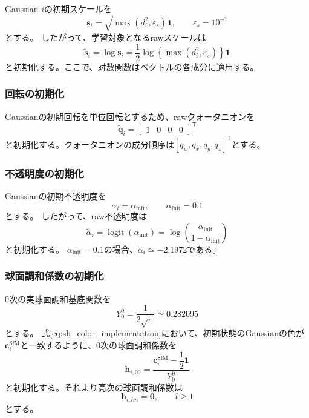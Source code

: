 \documentclass[dvipdfmx]{jlreq}
\begin{document}
Gaussian $i$の初期スケールを
\begin{equation}
    \bm{s}_i = \sqrt{\max\left(d_i^2,\varepsilon_s\right)}\bm{1}, \qquad \varepsilon_s=10^{-7}
    \label{eq:initial_gaussian_scale}
\end{equation}
とする。
したがって、学習対象となるrawスケールは
\begin{equation}
    \widetilde{\bm{s}}_i = \log\bm{s}_i = \frac{1}{2} \log\left\{\max\left(d_i^2,\varepsilon_s\right)\right\}\bm{1}
    \label{eq:initial_raw_scale}
\end{equation}
と初期化する。ここで、対数関数はベクトルの各成分に適用する。

\subsubsection*{回転の初期化}
Gaussianの初期回転を単位回転とするため、rawクォータニオンを
\begin{equation}
    \widetilde{\bm{q}}_i = \begin{bmatrix} 1 & 0 & 0 & 0 \end{bmatrix}^{\mathsf T}
    \label{eq:initial_raw_quaternion}
\end{equation}
と初期化する。クォータニオンの成分順序は$[q_w,q_x,q_y,q_z]^{\mathsf T}$とする。

\subsubsection*{不透明度の初期化}
Gaussianの初期不透明度を
\begin{equation}
    \alpha_i = \alpha_{\mathrm{init}},\qquad \alpha_{\mathrm{init}}=0.1
    \label{eq:initial_opacity}
\end{equation}
とする。
したがって、raw不透明度は
\begin{equation}
    \widetilde{\alpha}_i = \operatorname{logit} \left(\alpha_{\mathrm{init}}\right) = \log \left(\frac{\alpha_{\mathrm{init}}}{1-\alpha_{\mathrm{init}}}\right)
    \label{eq:initial_raw_opacity}
\end{equation}
と初期化する。
$\alpha_{\mathrm{init}}=0.1$の場合、$\widetilde{\alpha}_i\simeq-2.1972$である。

\subsubsection*{球面調和係数の初期化}
0次の実球面調和基底関数を
\begin{equation}
    Y_0^0 = \frac{1}{2\sqrt{\pi}} \simeq 0.282095
\end{equation}
とする。
式\eqref{eq:sh_color_implementation}において、初期状態のGaussianの色が$\bm{c}_i^{\mathrm{SfM}}$と一致するように、0次の球面調和係数を
\begin{equation}
    \bm{h}_{i,00} = \frac{ \bm{c}_i^{\mathrm{SfM}} - \dfrac{1}{2}\bm{1}}{Y_0^0}
    \label{eq:initial_sh_dc}
\end{equation}
と初期化する。それより高次の球面調和係数は
\begin{equation}
    \bm{h}_{i,lm} = \bm{0}, \qquad l\geq1
    \label{eq:initial_sh_rest}
\end{equation}
とする。
\end{document}
